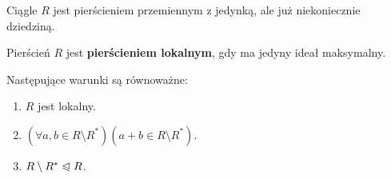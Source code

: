 \begin{context}
Ciągle $R$ jest pierścieniem przemiennym z jedynką, ale już niekoniecznie dziedziną.
\end{context}
\begin{definition}
	Pierścień $R$ jest \textbf{pierścieniem lokalnym}, gdy ma jedyny ideał maksymalny. 
\end{definition} 
\begin{theorem}	
	Następujące warunki są równoważne:
	\begin{enumerate}[label=\arabic*)]
		\item $R$ jest lokalny.
		\item $\left(\forall a,b \in R\setminus R^{\ast}  \right)\left( a + b \in R\setminus R^{\ast}  \right)  $.
		\item $R\setminus R^{\ast} \trianglelefteqslant R$.
	\end{enumerate}
\end{theorem} 
